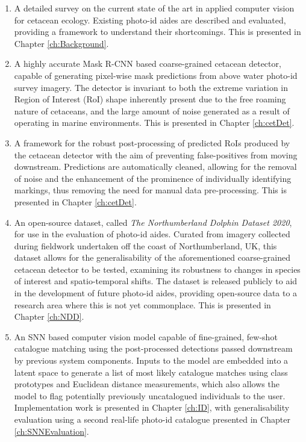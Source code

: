 \begin{enumerate}
	\item A detailed survey on the current state of the art in applied computer vision for cetacean ecology. Existing photo-id aides are described and evaluated, providing a framework to understand their shortcomings. This is presented in Chapter \ref{ch:Background}. 
	\item A highly accurate Mask R-CNN \cite{he_mask_2017} based coarse-grained cetacean detector, capable of generating pixel-wise mask predictions from above water photo-id survey imagery. The detector is invariant to both the extreme variation in Region of Interest (RoI) shape inherently present due to the free roaming nature of cetaceans, and the large amount of noise generated as a result of operating in marine environments.  This is presented in Chapter \ref{ch:cetDet}.
	\item A framework for the robust post-processing of predicted RoIs produced by the cetacean detector with the aim of preventing false-positives from moving downstream. Predictions are automatically cleaned, allowing for the removal of noise and the enhancement of the prominence of individually identifying markings, thus removing the need for manual data pre-processing. This is presented in Chapter \ref{ch:cetDet}.
	\item An open-source dataset, called \textit{The Northumberland Dolphin Dataset 2020}, for use in the evaluation of photo-id aides. Curated from imagery collected during fieldwork undertaken off the coast of Northumberland, UK, this dataset allows for the generalisability of the aforementioned coarse-grained cetacean detector to be tested, examining its robustness to changes in species of interest and spatio-temporal shifts. The dataset is released publicly to aid in the development of future photo-id aides, providing open-source data to a research area where this is not yet commonplace. This is presented in Chapter \ref{ch:NDD}.
	\item An SNN based computer vision model capable of fine-grained, few-shot catalogue matching using the post-processed detections passed downstream by previous system components. Inputs to the model are embedded into a latent space to generate a list of most likely catalogue matches using class prototypes and Euclidean distance measurements, which also allows the model to flag potentially previously uncatalogued individuals to the user. Implementation work is presented in Chapter \ref{ch:ID}, with generalisability evaluation using a second real-life photo-id catalogue presented in Chapter \ref{ch:SNNEvaluation}.
\end{enumerate}


